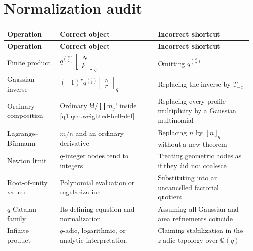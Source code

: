 \documentclass[11pt,a4paper,oneside,openany]{book}
\theoremstyle{definition}
\theoremstyle{remark}
\newcommand{\Q}{\mathbb Q}
\newcommand{\GB}[3][q]{\begin{bmatrix}#2\\#3\end{bmatrix}_{#1}}
\newcommand{\qi}[2][q]{[#2]_{#1}}
\newcommand{\qb}[2]{\GB{#1}{#2}}
\begin{document}
\section{Normalization audit}
\begin{longtable}{@{}>{\RaggedRight\arraybackslash}p{}>{\RaggedRight\arraybackslash}p{}>{\RaggedRight\arraybackslash}p{}@{}}
\toprule
\textbf{Operation} & \textbf{Correct object} & \textbf{Incorrect shortcut}\\
\midrule
\endfirsthead
\toprule
\textbf{Operation} & \textbf{Correct object} & \textbf{Incorrect shortcut}\\
\midrule
\endhead
Finite product & $q^{\binom k2}\qb Nk$ & Omitting $q^{\binom k2}$\\[1mm]
Gaussian inverse & $(-1)^r q^{\binom r2}\qb nr$ & Replacing the inverse by $T_{-c}$\\[1mm]
Ordinary composition & Ordinary $k!/\prod m_j!$ inside \eqref{q1:qcc:weighted-bell-def} & Replacing every profile multiplicity by a Gaussian multinomial\\[1mm]
Lagrange--B\"urmann & $m/n$ and an ordinary derivative & Replacing $n$ by $\qi n$ without a new theorem\\[1mm]
Newton limit & $q$-integer nodes tend to integers & Treating geometric nodes as if they did not coalesce\\[1mm]
Root-of-unity values & Polynomial evaluation or regularization & Substituting into an uncancelled factorial quotient\\[1mm]
$q$-Catalan family & Its defining equation and normalization & Assuming all Gaussian and area refinements coincide\\[1mm]
Infinite product & $q$-adic, logarithmic, or analytic interpretation & Claiming stabilization in the $z$-adic topology over $\Q(q)$\\
\bottomrule
\end{longtable}
\end{document}
